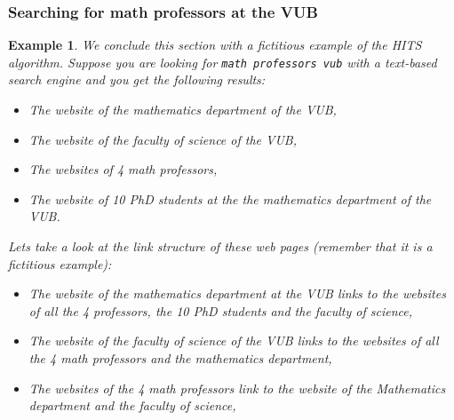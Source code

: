 \documentclass[a4paper,11pt]{report}
\newtheorem{example}[theorem]{Example}
\begin{document}
 \subsubsection{Searching for math professors at the VUB}
\begin{example}
  We conclude this section with a fictitious example of the HITS algorithm. Suppose you 
  are looking for \texttt{math professors vub} with a text-based search engine 
  and you get the following results:
  \begin{itemize}
    \item The website of the mathematics department of the VUB,
       \item The website of the faculty of science of the VUB,
    \item The websites of 4 math professors,
    \item The website of 10 PhD students at the the mathematics department of the VUB.
  \end{itemize}
Lets take a look at the link structure of these web pages (remember that it is a fictitious example):
  \begin{itemize}
    \item The website of the mathematics department at the VUB links to the websites of all the 4 professors, 
    the 10 PhD students and the faculty of science,
   
      \item The website of the faculty of science of the VUB links to the websites 
    of all the 4 math professors and the mathematics department,
    
 \item The websites of the 4 math professors link to the website of the 
    Mathematics department and the faculty of science,


\end{itemize}
\end{example}
\end{document}
